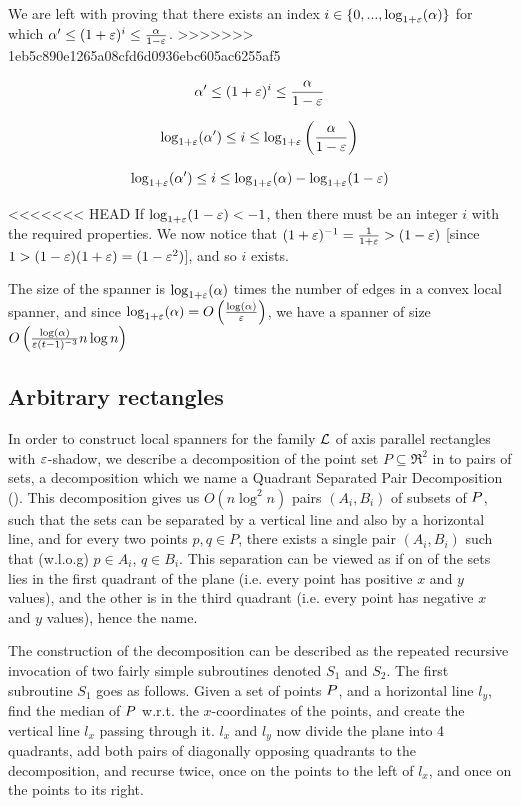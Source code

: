 \documentclass[12pt]{article}%
\begin{document}
We are left with proving that there exists an index $i\in \{0,...,\log_{1+\varepsilon}(\alpha)\}$ for which $\alpha' \leq (1+\varepsilon)^i \leq \frac{\alpha}{1-\varepsilon}$.
>>>>>>> 1eb5c890e1265a08cfd6d0936ebc605ac6255af5

$$\alpha' \leq (1+\varepsilon)^i \leq \frac{\alpha}{1-\varepsilon}$$

$$\log_{1+\varepsilon}(\alpha') \leq i \leq \log_{1+\varepsilon}\left(\frac{\alpha}{1-\varepsilon}\right)$$

$$\log_{1+\varepsilon}(\alpha') \leq i \leq \log_{1+\varepsilon}(\alpha) - \log_{1+\varepsilon}(1-\varepsilon)$$

<<<<<<< HEAD
If $\log_{1+\varepsilon}(1-\varepsilon)<-1$, then there must be an integer $i$ with
the required properties. We now notice that
$(1+\varepsilon)^{-1}=\frac{1}{1+\varepsilon}>(1-\varepsilon)$ [since
$1>(1-\varepsilon)(1+\varepsilon)=(1-\varepsilon^2)$], and so $i$ exists.

The size of the spanner is $\log_{1+\varepsilon}(\alpha)$ times the number of
edges in a convex local spanner, and since
$\log_{1+\varepsilon}(\alpha)=O\left(\frac{\log(\alpha)}{\varepsilon}\right)$, we
have a spanner of size
$O\left(\frac{\log(\alpha)}{\varepsilon (t-1)^{-3}}n\log n\right)$


\subsection{Arbitrary rectangles}

In order to construct local spanners for the family $\mathcal{L}$ of axis
parallel rectangles with $\varepsilon$-shadow, we describe a decomposition of
the point set $P\subseteq \Re^2$ in to pairs of sets, a decomposition
which we name a Quadrant Separated Pair Decomposition (\QSPD). This
decomposition gives us $O(n\log^2n)$ pairs $(A_i,B_i)$ of subsets of
$P$, such that the sets can be separated by a vertical line and also
by a horizontal line, and for every two points $p,q\in P$, there
exists a single pair $(A_i,B_i)$ such that (w.l.o.g) $p\in A_i$,
$q\in B_i$. This separation can be viewed as if on of the sets lies in
the first quadrant of the plane (i.e. every point has positive $x$ and
$y$ values), and the other is in the third quadrant (i.e. every point
has negative $x$ and $y$ values), hence the name.

The construction of the decomposition can be described as the repeated
recursive invocation of two fairly simple subroutines denoted $S_1$
and $S_2$. The first subroutine $S_1$ goes as follows. Given a set of
points $P$, and a horizontal line $l_y$, find the median of $P$
w.r.t. the $x$-coordinates of the points, and create the vertical line
$l_x$ passing through it. $l_x$ and $l_y$ now divide the plane into 4
quadrants, add both pairs of diagonally opposing quadrants to the
decomposition, and recurse twice, once on the points to the left of
$l_x$, and once on the points to its right.
\end{document}

